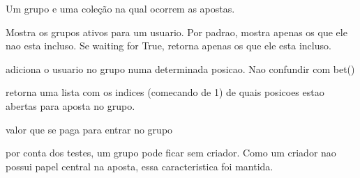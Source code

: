 \documentclass[letterpaper,10pt,english]{sphinxmanual}
\begin{document}
\begin{fulllineitems}
\label{modules/models:ubet.models.Group}
Um grupo e uma coleção na qual ocorrem as apostas.

\begin{fulllineitems}
\label{modules/models:ubet.models.Group.active_groups}
Mostra os grupos ativos para um usuario. 
Por padrao, mostra apenas os que ele nao esta incluso. 
Se waiting for True, retorna apenas os que ele esta incluso.

\end{fulllineitems}


\begin{fulllineitems}
\label{modules/models:ubet.models.Group.add_user}
adiciona o usuario no grupo numa determinada posicao. Nao confundir com bet()

\end{fulllineitems}


\begin{fulllineitems}
\label{modules/models:ubet.models.Group.available_positions}
retorna uma lista com os indices (comecando de 1) de quais posicoes estao abertas
para aposta no grupo.

\end{fulllineitems}


\begin{fulllineitems}
\label{modules/models:ubet.models.Group.bet_value}
valor que se paga para entrar no grupo

\end{fulllineitems}


\begin{fulllineitems}
\label{modules/models:ubet.models.Group.creator}
por conta dos testes, um grupo pode ficar sem criador.
Como um criador nao possui papel central na aposta, essa caracteristica
foi mantida.


\end{fulllineitems}
\end{fulllineitems}
\end{document}

